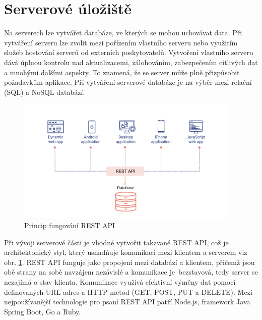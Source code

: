 \documentclass[czech, bc, kiv, he, iso690numb]{fasthesis}
\begin{document}
\section{Serverové úložiště} \label{server_storing}

Na serverech lze vytvářet databáze, ve kterých se mohou uchovávat data. Při vytváření serveru lze zvolit mezi pořízením vlastního serveru nebo využitím služeb hostování serverů od externích poskytovatelů. Vytvoření vlastního serveru dává úplnou kontrolu nad aktualizacemi, zálohováním, zabezpečením citlivých dat a mnohými dalšími aspekty. To znamená, že se server může plně přizpůsobit požadavkům aplikace. Při vytváření serverové databáze je na výběr mezi relační (\gls{SQL}) a \gls{NoSQL} databází. \cite{in-house-servers}

\begin{figure}[h]
  \centering
  \includegraphics[width=0.95\textwidth]{img/BP-Runt/Data_storing/server/Understanding-REST-API.png}
  \caption{Princip fungování REST API \cite{understanding-rest-api}}
  \label{fig:restful-api}
\end{figure}

Při vývoji serverové části je vhodné vytvořit takzvané \gls{REST} \gls{API}, což je architektonický styl, který usnadňuje komunikaci mezi klientem a serverem viz obr. \ref{fig:restful-api}. \gls{REST} \gls{API} funguje jako propojení mezi databází a klientem, přičemž jsou obě strany na sobě navzájem nezávislé a komunikace je~bezstavová, tedy server se nezajímá o stav klienta. Komunikace využívá efektivní výměny dat pomocí definovaných \gls{URL} adres a \gls{HTTP} metod (GET, POST, PUT a DELETE). Mezi nejpoužívanější technologie pro psaní \gls{REST} \gls{API} patří Node.js, framework Java Spring Boot, Go a Ruby. \cite{codecami-rest} \cite{understanding-rest-api} \cite{rest-for-mobile-apps}
\end{document}
